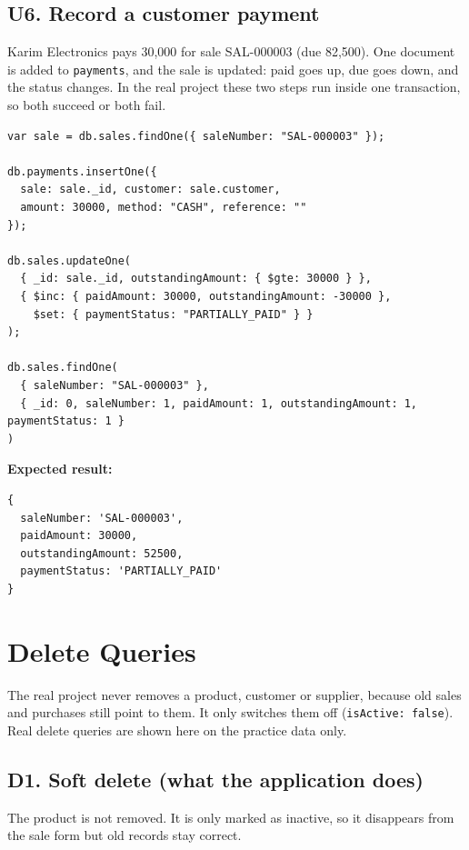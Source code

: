 \documentclass[11pt,a4paper]{article}
\newcommand{\code}[1]{\texttt{#1}}
\begin{document}
\subsection*{U6. Record a customer payment}
Karim Electronics pays 30,000 for sale SAL-000003 (due 82,500). One document is added to \code{payments}, and the sale is updated: paid goes up, due goes down, and the status changes. In the real project these two steps run inside one transaction, so both succeed or both fail.

\begin{minipage}{\linewidth}
\begin{lstlisting}[style=query]
var sale = db.sales.findOne({ saleNumber: "SAL-000003" });

db.payments.insertOne({
  sale: sale._id, customer: sale.customer,
  amount: 30000, method: "CASH", reference: ""
});

db.sales.updateOne(
  { _id: sale._id, outstandingAmount: { $gte: 30000 } },
  { $inc: { paidAmount: 30000, outstandingAmount: -30000 },
    $set: { paymentStatus: "PARTIALLY_PAID" } }
);

db.sales.findOne(
  { saleNumber: "SAL-000003" },
  { _id: 0, saleNumber: 1, paidAmount: 1, outstandingAmount: 1, paymentStatus: 1 }
)
\end{lstlisting}
\end{minipage}

\noindent\textbf{Expected result:}
\begin{lstlisting}[style=result]
{
  saleNumber: 'SAL-000003',
  paidAmount: 30000,
  outstandingAmount: 52500,
  paymentStatus: 'PARTIALLY_PAID'
}
\end{lstlisting}

\section{Delete Queries}
The real project never removes a product, customer or supplier, because old sales and purchases still point to them. It only switches them off (\code{isActive: false}). Real delete queries are shown here on the practice data only.

\subsection*{D1. Soft delete (what the application does)}
The product is not removed. It is only marked as inactive, so it disappears from the sale form but old records stay correct.
\end{document}
